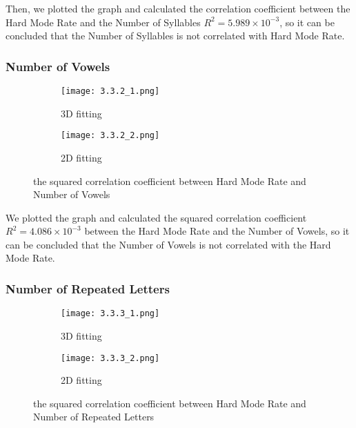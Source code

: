 \documentclass[12pt]{article}  %
\begin{document}
Then, we plotted the graph and calculated the correlation coefficient between the Hard Mode Rate and the Number of Syllables $R^{2}=5.989 \times   10^{-3}$, so it can be concluded that the Number of Syllables is not correlated with Hard Mode Rate.
\vspace{-0.7cm}
\subsubsection{Number of Vowels}

            \begin{figure*}[h]
                \centering
                \begin{subfigure}[b]{0.4\textwidth}
                    \texttt{[image: 3.3.2\_1.png]}
                    \caption{3D fitting}
                \end{subfigure}
                \begin{subfigure}[b]{0.4\textwidth}
                    \texttt{[image: 3.3.2\_2.png]}
                    \caption{2D fitting}
                \end{subfigure}
                \caption{the squared correlation coefficient between Hard Mode Rate and Number of Vowels}
            \end{figure*}

We plotted the graph and calculated the squared correlation coefficient $R^{2}=4.086 \times   10^{-3}$ between the Hard Mode Rate and the Number of Vowels, so it can be concluded that the Number of Vowels is not correlated with the Hard Mode Rate.


\subsubsection{Number of Repeated Letters}

            \begin{figure*}[h]
                \centering
                \begin{subfigure}[b]{0.4\textwidth}
                    \texttt{[image: 3.3.3\_1.png]}
                    \caption{3D fitting}
                \end{subfigure}
                \begin{subfigure}[b]{0.4\textwidth}
                    \texttt{[image: 3.3.3\_2.png]}
                    \caption{2D fitting}
                \end{subfigure}
                \caption{the squared correlation coefficient between Hard Mode Rate and Number of Repeated Letters}
            \end{figure*}
\end{document}
